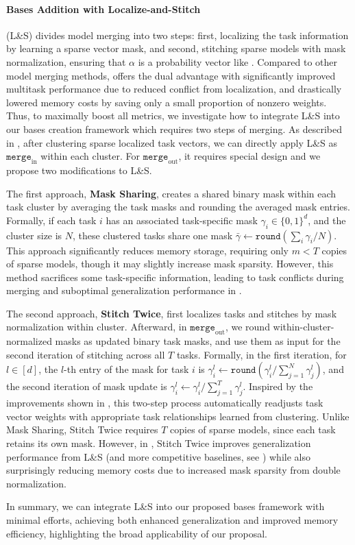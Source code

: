 \paragraph{Bases Addition with Localize-and-Stitch} \label{sec:localize-and-stitch}
(L\&S) \citet{he2024localize} divides model merging into two steps: first, localizing the task information by learning a sparse vector mask, and second, stitching sparse models with mask normalization, ensuring that $\alpha$ is a probability vector like . Compared to other model merging methods, \citet{he2024localize} offers the dual advantage with significantly improved multitask performance due to reduced conflict from localization, and drastically lowered memory costs by saving only a small proportion of nonzero weights. Thus, to maximally boost all metrics, we investigate how to integrate L\&S into our bases creation framework which requires two steps of merging. As described in , after clustering sparse localized task vectors, we can directly apply L\&S as $\texttt{merge}_\text{in}$ within each cluster. For $\texttt{merge}_\text{out}$, it requires special design and we propose two modifications to L\&S. 

The first approach, \textbf{Mask Sharing}, creates a shared binary mask within each task cluster by averaging the task masks and rounding the averaged mask entries. Formally, if each task $i$ has an associated task-specific mask $\gamma_i \in \{0,1\}^d$, and the cluster size is $N$, these clustered tasks share one mask $\bar\gamma \leftarrow \texttt{round}(\sum_{i}\gamma_i/N)$. This approach significantly reduces memory storage, requiring only $m < T$ copies of sparse models, though it may slightly increase mask sparsity. However, this method sacrifices some task-specific information, leading to task conflicts during merging and suboptimal generalization performance in . 

The second approach, \textbf{Stitch Twice}, first localizes tasks and stitches by mask normalization within cluster. Afterward, in $\texttt{merge}_\text{out}$, we round within-cluster-normalized masks as updated binary task masks, and use them as input for the second iteration of stitching across all $T$ tasks. Formally, in the first iteration, for $l \in [d]$, the $l$-th entry of the mask for task $i$ is $\gamma_i^l \leftarrow \texttt{round}(\gamma_i^l/\sum_{j=1}^N\gamma_j^l)$, and the second iteration of mask update is $\gamma_i^l \leftarrow \gamma_i^l/\sum_{j=1}^T\gamma_j^l$. Inspired by the improvements shown in , this two-step process automatically readjusts task vector weights with appropriate task relationships learned from clustering. Unlike Mask Sharing, Stitch Twice requires $T$ copies of sparse models, since each task retains its own mask. However, in , Stitch Twice improves generalization performance from L\&S (and more competitive baselines, see ) while also surprisingly reducing memory costs due to increased mask sparsity from double normalization. 

In summary, we can integrate L\&S into our proposed bases framework with minimal efforts, achieving both enhanced generalization and improved memory efficiency, highlighting the broad applicability of our proposal.




